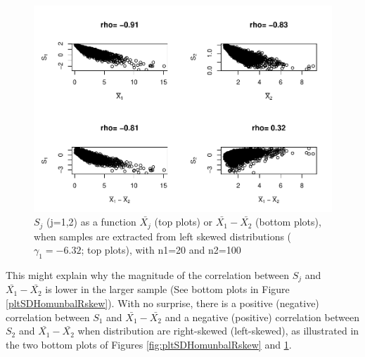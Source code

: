 \documentclass[
  man]{apa6}
\begin{document}
\begin{figure}
\centering
\includegraphics{Correlations-between-the-sample-means-difference-and-standardizers-of-all-estimators,-and-implications-on-biases-and-variances-of-all-estimators_files/figure-latex/pltSDHomunbalLskew-1.pdf}
\caption{\label{fig:pltSDHomunbalLskew}\(S_j\) (j=1,2) as a function \(\bar{X_j}\) (top plots) or \(\bar{X_1}-\bar{X_2}\) (bottom plots), when samples are extracted from left skewed distributions (\(\gamma_1 = -6.32\); top plots), with n1=20 and n2=100}
\end{figure}

This might explain why the magnitude of the correlation between \(S_j\) and \(\bar{X_1}-\bar{X_2}\) is lower in the larger sample (See bottom plots in Figure \ref{pltSDHomunbalRskew}). With no surprise, there is a positive (negative) correlation between \(S_1\) and \(\bar{X_1}-\bar{X_2}\) and a negative (positive) correlation between \(S_2\) and \(\bar{X_1}-\bar{X_2}\) when distribution are right-skewed (left-skewed), as illustrated in the two bottom plots of Figures \ref{fig:pltSDHomunbalRskew} and \ref{fig:pltSDHomunbalLskew}.
\end{document}
